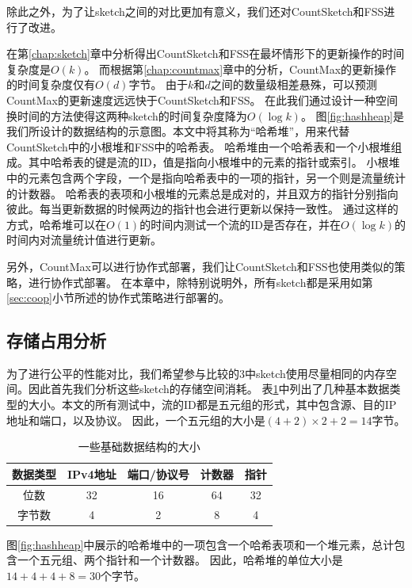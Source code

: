 除此之外，为了让sketch之间的对比更加有意义，我们还对CountSketch和FSS进行了改进。

在第\ref{chap:sketch}章中分析得出CountSketch和FSS在最坏情形下的更新操作的时间复杂度是$O(k)$。
而根据第\ref{chap:countmax}章中的分析，CountMax的更新操作的时间复杂度仅有$O(d)$字节。
由于$k$和$d$之间的数量级相差悬殊，可以预测CountMax的更新速度远远快于CountSketch和FSS。
在此我们通过设计一种空间换时间的方法使得这两种sketch的时间复杂度降为$O(\log{k})$。
图\ref{fig:hashheap}是我们所设计的数据结构的示意图。本文中将其称为“哈希堆”，用来代替CountSketch中的小根堆和FSS中的哈希表。
哈希堆由一个哈希表和一个小根堆组成。其中哈希表的键是流的ID，值是指向小根堆中的元素的指针或索引。
小根堆中的元素包含两个字段，一个是指向哈希表中的一项的指针，另一个则是流量统计的计数器。
哈希表的表项和小根堆的元素总是成对的，并且双方的指针分别指向彼此。每当更新数据的时候两边的指针也会进行更新以保持一致性。
通过这样的方式，哈希堆可以在$O(1)$的时间内测试一个流的ID是否存在，并在$O(\log{k})$的时间内对流量统计值进行更新。

另外，CountMax可以进行协作式部署，我们让CountSketch和FSS也使用类似的策略，进行协作式部署。
在本章中，除特别说明外，所有sketch都是采用如第\ref{sec:coop}小节所述的协作式策略进行部署的。



\subsection{存储占用分析}\label{subsec:memory}

为了进行公平的性能对比，我们希望参与比较的3中sketch使用尽量相同的内存空间。因此首先我们分析这些sketch的存储空间消耗。
表\ref{tbl:datasize}中列出了几种基本数据类型的大小。本文的所有测试中，流的ID都是五元组的形式，其中包含源、目的IP地址和端口，以及协议。
因此，一个五元组的大小是$ (4 + 2 ) \times 2 + 2=14$字节。

\begin{table}[h]
	\centering
    \caption{\textnormal{一些基础数据结构的大小}}
	\begin{tabular}{c|c|c|c|c}
		\hline
		数据类型 & IPv4地址 & 端口/协议号 & 计数器 &指针\\
		\hline
		位数 & 32 & 16 & 64 & 32\\
		\hline
		字节数 & 4 & 2 & 8 & 4\\
		\hline
	\end{tabular}
    \label{tbl:datasize}
\end{table}

图\ref{fig:hashheap}中展示的哈希堆中的一项包含一个哈希表项和一个堆元素，总计包含一个五元组、两个指针和一个计数器。
因此，哈希堆的单位大小是$14+4+4+8=30$个字节。

